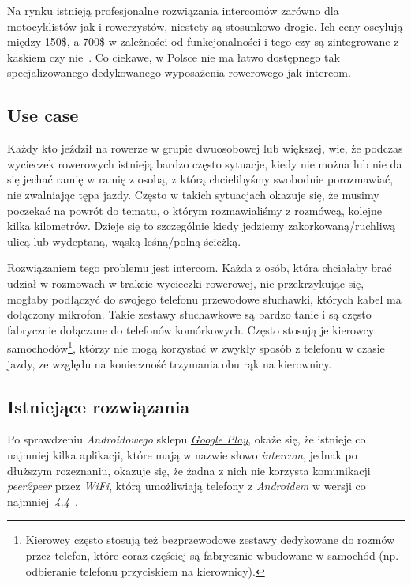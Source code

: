 \documentclass{article}
\begin{document}
Na rynku istnieją profesjonalne rozwiązania intercomów zarówno dla motocyklistów jak i rowerzystów, niestety są stosunkowo drogie. Ich ceny oscylują między 150\$, a 700\$ w zależności od funkcjonalności i tego czy są zintegrowane z kaskiem czy nie~\cite{www:bike-intercom}\cite{www:bike-intercom-mce}. Co ciekawe, w Polsce nie ma łatwo dostępnego tak specjalizowanego dedykowanego wyposażenia rowerowego jak intercom.


\subsection{Use case}

Każdy kto jeździł na rowerze w grupie dwuosobowej lub większej, wie, że podczas wycieczek rowerowych istnieją bardzo często sytuacje, kiedy nie można lub nie da się jechać ramię w ramię z osobą, z którą chcielibyśmy swobodnie porozmawiać, nie zwalniając tępa jazdy. Często w takich sytuacjach okazuje się, że musimy poczekać na powrót do tematu, o którym rozmawialiśmy z rozmówcą, kolejne kilka kilometrów. Dzieje się to szczególnie kiedy jedziemy zakorkowaną/ruchliwą ulicą lub wydeptaną, wąską leśną/polną ścieżką.

Rozwiązaniem tego problemu jest intercom. Każda z osób, która chciałaby brać udział w rozmowach w trakcie wycieczki rowerowej, nie przekrzykując się, mogłaby podłączyć do swojego telefonu przewodowe słuchawki, których kabel ma dołączony mikrofon. Takie zestawy słuchawkowe są bardzo tanie i są często fabrycznie dołączane do telefonów komórkowych. Często stosują je kierowcy samochodów\footnote{Kierowcy często stosują też bezprzewodowe zestawy dedykowane do rozmów przez telefon, które coraz częściej są fabrycznie wbudowane w samochód (np. odbieranie telefonu przyciskiem na kierownicy).}, którzy nie mogą korzystać w zwykły sposób z telefonu w czasie jazdy, ze względu na konieczność trzymania obu rąk na kierownicy.


\subsection{Istniejące rozwiązania}

Po sprawdzeniu \emph{Androidowego} sklepu \href{https://play.google.com/store}{\emph{Google Play}}, okaże się, że istnieje co najmniej kilka aplikacji, które mają w nazwie słowo \emph{intercom}, jednak po dłuższym rozeznaniu, okazuje się, że żadna z nich nie korzysta komunikacji \emph{peer2peer} przez \emph{WiFi}, którą umożliwiają telefony z \emph{Androidem} w wersji co najmniej~\emph{4.4}~\cite{www:android-wifi-p2p}\cite{www:android-wifi-p2p-tutorial}.
\end{document}
